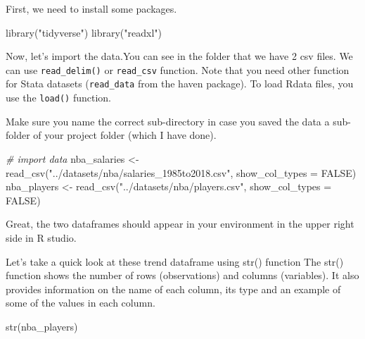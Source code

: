 \documentclass[
]{book}
\newenvironment{Shaded}{\begin{snugshade}}{\end{snugshade}}
\newcommand{\AttributeTok}[1]{\textcolor[rgb]{0.77,0.63,0.00}{#1}}
\newcommand{\CommentTok}[1]{\textcolor[rgb]{0.56,0.35,0.01}{\textit{#1}}}
\newcommand{\ConstantTok}[1]{\textcolor[rgb]{0.00,0.00,0.00}{#1}}
\newcommand{\FunctionTok}[1]{\textcolor[rgb]{0.00,0.00,0.00}{#1}}
\newcommand{\NormalTok}[1]{#1}
\newcommand{\OtherTok}[1]{\textcolor[rgb]{0.56,0.35,0.01}{#1}}
\newcommand{\StringTok}[1]{\textcolor[rgb]{0.31,0.60,0.02}{#1}}
\begin{document}
First, we need to install some packages.

\begin{Shaded}
\begin{Highlighting}[]
\FunctionTok{library}\NormalTok{(}\StringTok{"tidyverse"}\NormalTok{)}
\FunctionTok{library}\NormalTok{(}\StringTok{"readxl"}\NormalTok{)}
\end{Highlighting}
\end{Shaded}

Now, let's import the data.You can see in the folder that we have 2 csv files.
We can use \texttt{read\_delim()} or \texttt{read\_csv} function. Note that you need other function for Stata datasets (\texttt{read\_data} from the haven package). To load Rdata files, you use the \texttt{load()} function.

Make sure you name the correct sub-directory in case you saved the data a sub-folder of your project folder (which I have done).

\begin{Shaded}
\begin{Highlighting}[]
\CommentTok{\# import data }
\NormalTok{nba\_salaries }\OtherTok{\textless{}{-}} \FunctionTok{read\_csv}\NormalTok{(}\StringTok{"../datasets/nba/salaries\_1985to2018.csv"}\NormalTok{, }\AttributeTok{show\_col\_types =} \ConstantTok{FALSE}\NormalTok{)}
\NormalTok{nba\_players }\OtherTok{\textless{}{-}} \FunctionTok{read\_csv}\NormalTok{(}\StringTok{"../datasets/nba/players.csv"}\NormalTok{, }\AttributeTok{show\_col\_types =} \ConstantTok{FALSE}\NormalTok{)}
\end{Highlighting}
\end{Shaded}

Great, the two dataframes should appear in your environment in the upper right side in R studio.

Let's take a quick look at these trend dataframe using str() function The str() function shows the number of rows (observations) and columns (variables). It also provides information on the name of each column, its type and an example of some of the values in each column.

\begin{Shaded}
\begin{Highlighting}[]
\FunctionTok{str}\NormalTok{(nba\_players)}
\end{Highlighting}
\end{Shaded}
\end{document}
